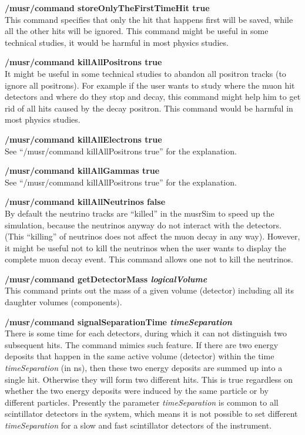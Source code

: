 \documentclass[twoside]{dis04}
\begin{document}
\begin{description}
\item{\bf /musr/command storeOnlyTheFirstTimeHit true}\\
	This command specifies that only the hit that happens first will be
	saved, while all the other hits will be ignored.
	This command might be useful in some technical studies, it would
	be harmful in most physics studies.

\item{\bf /musr/command killAllPositrons true}\\
	It might be useful in some technical studies to abandon all positron
	tracks (to ignore all positrons).  For example if the user wants
	to study where the muon hit detectors and where do they stop and
	decay, this command might help him to get rid of all hits
	caused by the decay positron.  This command would be
	harmful in most physics studies.

\item{\bf /musr/command killAllElectrons true}\\
        See ``/musr/command killAllPositrons true'' for the explanation.

\item{\bf /musr/command killAllGammas true}\\
	See ``/musr/command killAllPositrons true'' for the explanation.

\item{\bf /musr/command killAllNeutrinos false}\\
	By default the neutrino tracks are ``killed'' in the musrSim to
	speed up the simulation, because
	the neutrinos anyway do not interact with the detectors.
	(This ``killing'' of neutrinos does not affect the muon decay in
	any way).
	However, it might be useful not to kill the neutrinos when the
	user wants to display the complete muon decay event.
	This command allows one not to kill the neutrinos.

\item{\bf /musr/command getDetectorMass \emph{logicalVolume}}\\
	This command prints out the mass of a given volume (detector)
	including all its daughter volumes (components).

\item{\bf /musr/command signalSeparationTime \emph{timeSeparation}}\\
	There is some time for each detectors, during which it can not distinguish
	two subsequent hits.  The command mimics such feature.
	If there are two energy deposits that happen in the same
	active volume (detector) within the time \emph{timeSeparation}
	(in ns), then these two energy deposits are summed up into
	a single hit.  Otherwise they will form two different hits.
	This is true regardless on whether the two energy deposits were
	induced by the same particle or by different particles.
	Presently the parameter \emph{timeSeparation} is common to all
	scintillator detectors in the system, which means it is not
	possible to set different \emph{timeSeparation} for a slow
	and fast scintillator detectors of the instrument.


\end{description}
\end{document}
